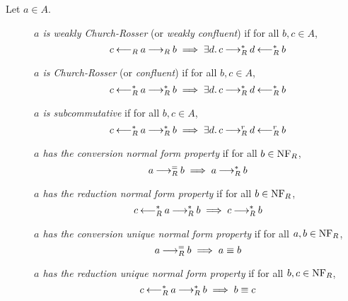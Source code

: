 \begin{definition} Let $a \in A$.
    \begin{description}
        \item[] \emph{$a$ is weakly Church-Rosser} (or \emph{weakly confluent}) if for all $b,c \in A$, \[c \mathbin{\longleftarrow_R} a \mathbin{\longrightarrow_R} b \implies \exists d.\, c \mathbin{\longrightarrow_R^*} d \mathbin{\longleftarrow_R^*} b\]
        \item[] \emph{$a$ is Church-Rosser} (or \emph{confluent}) if for all $b,c \in A$, \[c \mathbin{\longleftarrow_R^*} a \mathbin{\longrightarrow_R^*} b \implies \exists d.\, c \mathbin{\longrightarrow_R^*} d \mathbin{\longleftarrow_R^*} b\]
        \item[] \emph{$a$ is subcommutative} if for all $b, c \in A$,
        \[c \mathbin{\longleftarrow_R^*} a \mathbin{\longrightarrow_R^*} b \implies \exists d. \, c \mathbin{\longrightarrow_R^r} d \mathbin{\longleftarrow_R^r} b\]
        \item[] \emph{$a$ has the conversion normal form property} if for all $b \in \mathrm{NF}_R$, \[ a \mathbin{\longrightarrow_R^=} b \implies a\mathbin{\longrightarrow_R^*} b\]
        \item[] \emph{$a$ has the reduction normal form property} if for all $b \in \mathrm{NF}_R$,
        \[c \mathbin{\longleftarrow_R^*} a \mathbin{\longrightarrow_R^*} b \implies c \mathbin{\longrightarrow_R^*} b\]
        \item[] \emph{$a$ has the conversion unique normal form property} if for all $a, b \in \mathrm{NF}_R$, \[a \mathbin{\longrightarrow_R^=} b \implies a \equiv b\]
        \item[] \emph{$a$ has the reduction unique normal form property} if for all $b, c \in \mathrm{NF}_R$,
        \[c \mathbin{\longleftarrow_R^*} a \mathbin{\longrightarrow_R^*} b  \implies b \equiv c\]
    \end{description}
\end{definition}
